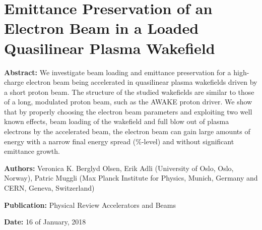 %
%

\chapter[Emittance Preservation of an Electron Beam in a Loaded Quasilinear Plasma\\Wakefield, \emph{Physical Review Accelerators and Beams}]%
        {Emittance Preservation of an Electron Beam in a Loaded\\Quasilinear Plasma Wakefield}
\label{Pub:BL17}

\begin{hangparas}{10mm}{1}

    \textbf{Abstract:}
    We investigate beam loading and emittance preservation for a high-charge electron beam being accelerated in quasilinear plasma wakefields driven by a short proton beam. The structure of the studied wakefields are similar to those of a long, modulated proton beam, such as the AWAKE proton driver. We show that by properly choosing the electron beam parameters and exploiting two well known effects, beam loading of the wakefield and full blow out of plasma electrons by the accelerated beam, the electron beam can gain large amounts of energy with a narrow final energy spread (\%-level) and without significant emittance growth.

    \vspace{8mm}

    \textbf{Authors:}
    Veronica K. Berglyd Olsen, Erik Adli (University of Oslo, Oslo, Norway),
    Patric Muggli (Max Planck Institute for Physics, Munich, Germany and CERN, Geneva, Switzerland)

    \vspace{5mm}

    \textbf{Publication:}
    Physical Review Accelerators and Beams \cite{berglyd_olsen:2018}

    \vspace{5mm}

    \textbf{Date:} 16 of January, 2018

\end{hangparas}
